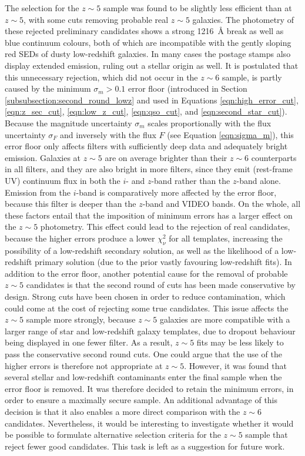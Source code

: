 The selection for the $z\sim5$ sample was found to be slightly less efficient than at $z\sim5$, with some cuts removing probable real $z\sim5$ galaxies. The photometry of these rejected preliminary candidates shows a strong \SI{1216}{\angstrom} break as well as blue continuum colours, both of which are incompatible with the gently sloping red SEDs of dusty low-redshift galaxies. In many cases the postage stamps also display extended emission, ruling out a stellar origin as well. It is postulated that this unnecessary rejection, which did not occur in the $z\sim6$ sample, is partly caused by the minimum $\sigma_{m}>0.1$ error floor (introduced in Section \ref{subsubsection:second_round_lowz} and used in Equations \ref{eqn:high_error_cut}, \ref{eqn:z_sec_cut}, \ref{eqn:low_z_cut}, \ref{eqn:qso_cut}, and \ref{eqn:second_star_cut}). Because the magnitude uncertainty $\sigma_{m}$ scales proportionally with the flux uncertainty $\sigma_{F}$ and inversely with the flux $F$ (see Equation \ref{eqn:sigma_m}), this error floor only affects filters with sufficiently deep data and adequately bright emission. Galaxies at $z\sim5$ are on average brighter than their $z\sim6$ counterparts in all filters, and they are also bright in more filters, since they emit (rest-frame UV) continuum flux in both the $i$- and $z$-band rather than the $z$-band alone. Emission from the $i$-band is comparatively more affected by the error floor, because this filter is deeper than the $z$-band and VIDEO bands. On the whole, all these factors entail that the imposition of minimum errors has a larger effect on the $z\sim5$ photometry. This effect could lead to the rejection of real candidates, because the higher errors produce a lower $\chi^2_{\nu}$ for all templates, increasing the possibility of a low-redshift secondary solution, as well as the likelihood of a low-redshift primary solution (due to the prior vastly favouring low-redshift fits). In addition to the error floor, another potential cause for the removal of probable $z\sim5$ candidates is that the second round of cuts has been made conservative by design. Strong cuts have been chosen in order to reduce contamination, which could come at the cost of rejecting some true candidates. This issue affects the $z\sim5$ sample more strongly, because $z\sim5$ galaxies are more compatible with a larger range of star and low-redshift galaxy templates, due to dropout behaviour being displayed in one fewer filter. As a result, $z\sim5$ fits may be less likely to pass the conservative second round cuts. One could argue that the use of the higher errors is therefore not appropriate at $z\sim5$. However, it was found that several stellar and low-redshift contaminants enter the final sample when the error floor is removed. It was therefore decided to retain the minimum errors, in order to ensure a maximally secure sample. An additional advantage of this decision is that it also enables a more direct comparison with the $z\sim6$ candidates. Nevertheless, it would be interesting to investigate whether it would be possible to formulate alternative selection criteria for the $z\sim5$ sample that reject fewer good candidates. This task is left as a suggestion for future work. \par 


